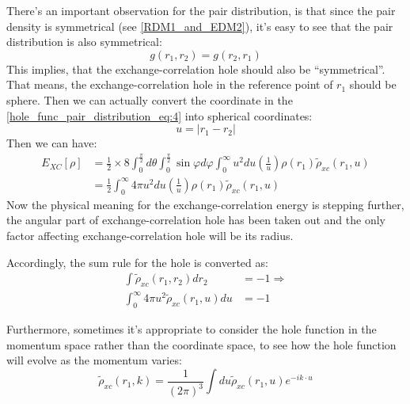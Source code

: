There's an important observation for the pair distribution, is that since the
pair density is symmetrical (see \ref{RDM1_and_EDM2}), it's easy to see that
the pair distribution is also symmetrical:
\begin{equation}
 \label{hole_func_pair_distribution_eq:5}
g(r_{1},r_{2}) = g(r_{2},r_{1})
\end{equation}
This implies, that the exchange-correlation hole should also be
``symmetrical''. That means, the exchange-correlation hole in the reference
point of $r_{1}$ should be sphere. Then we can actually convert the coordinate
in the \ref{hole_func_pair_distribution_eq:4} into spherical coordinates:
\begin{equation}
 u = |r_{1} -  r_{2} |
\end{equation}
Then we can have:
\begin{equation}
\begin{split}
 E_{XC}[\rho] &= 
\frac{1}{2}\times 
8 \int^{\frac{\pi}{2}}_{0}d\theta
\int^{\frac{\pi}{2}}_{0}\sin\varphi d\varphi
\int^{\infty}_{0}u^{2}du
 \left(\frac{1}{u}\right)
\rho(r_{1})\widetilde{\rho}_{xc}(r_{1},u) \\
&= \frac{1}{2}\int^{\infty}_{0}4\pi u^{2}du
\left(\frac{1}{u}\right)
\rho(r_{1})\widetilde{\rho}_{xc}(r_{1},u)
\end{split}
 \label{hole_func_pair_distribution_eq:6}
\end{equation}
Now the physical meaning for the exchange-correlation energy is stepping
further, the angular part of exchange-correlation hole has been taken out and
the only factor affecting exchange-correlation hole will be its radius.

Accordingly, the sum rule for the hole is converted as:
\begin{equation}
\begin{split}
 \int \widetilde{\rho}_{xc}(r_{1},r_{2}) dr_{2} &= -1 \Rightarrow \\
\int^{\infty}_{0}4\pi u^{2}
\widetilde{\rho}_{xc}(r_{1},u) du  &= -1
\end{split}
 \label{hole_func_pair_distribution_eq:7}
\end{equation}

Furthermore, sometimes it's appropriate to consider the hole function in the
momentum space rather than the coordinate space, to see how the hole function
will evolve as the momentum varies\cite{burke1995real}:
\begin{equation}
 \widetilde{\rho}_{xc}(r_{1},k) = \frac{1}{(2\pi)^{3}}
\int du \widetilde{\rho}_{xc}(r_{1},u)e^{-ik\cdot u}
\end{equation}


